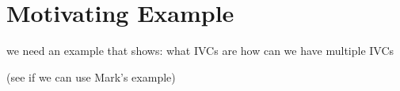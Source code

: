 \section{Motivating Example}
\label{sec:exmpl}

we need an example that shows:
 what IVCs are
 how can we have multiple IVCs
 
 (see if we can use Mark's example)
